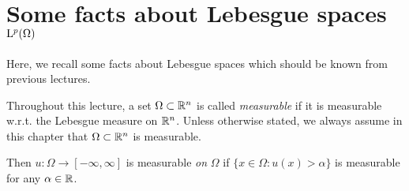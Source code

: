 \chapter{Some facts about Lebesgue spaces \texorpdfstring{$\mathrm{L}^p(\Omega)$}{L\textasciicircum p(Omega)}}

Here, we recall some facts about Lebesgue spaces which should be known from previous lectures.

Throughout this lecture, a set $\Omega \subset \mathbb{R}^n$ is called \emph{measurable} if it is measurable w.r.t. the Lebesgue measure on $\mathbb{R}^n$.
Unless otherwise stated, we always assume in this chapter that $\Omega \subset \mathbb{R}^n$ is measurable.

Then $u \colon \Omega \to [-\infty,\infty]$ is measurable \emph{on} $\Omega$ if $\{x \in \Omega \colon u(x) > \alpha\}$ is measurable for any $\alpha \in \mathbb{R}$.

